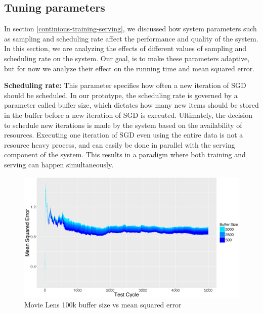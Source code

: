 \documentclass{vldb}
\begin{document}
\subsection{Tuning parameters} \label{tuning}
In section \ref{continious-training-serving}, we discussed how system parameters such as sampling and scheduling rate affect the performance and quality of the system.
In this section, we are analyzing the effects of different values of sampling and scheduling rate on the system.
Our goal, is to make these parameters adaptive, but for now we analyze their effect on the running time and mean squared error. 

\textbf{Scheduling rate:} This parameter specifies how often a new iteration of SGD should be scheduled. 
In our prototype, the scheduling rate is governed by a parameter called buffer size, which dictates how many new items should be stored in the buffer before a new iteration of SGD is executed. 
Ultimately, the decision to schedule new iterations is made by the system based on the availability of resources. 
Executing one iteration of SGD even using the entire data is not a resource heavy process, and can easily be done in parallel with the serving component of the system. 
This results in a paradigm where both training and serving can happen simultaneously. 

\begin{figure}[H]
\centering
\includegraphics[width=\columnwidth]{../images/experiment-results/movie-lens-100k-buffer-size-improved.eps}
\caption{Movie Lens 100k buffer size vs mean squared error}
\label{fig:movie-lens-100k-buffer-size-mse}
\end{figure}
\end{document}
